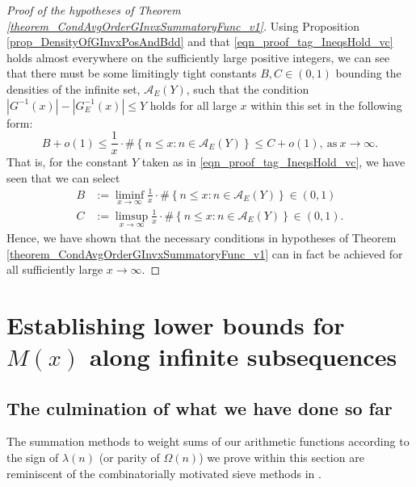 \documentclass[11pt,reqno,a4letter]{article}
\numberwithin{figure}{section}
\numberwithin{table}{section}
\theoremstyle{plain}
\numberwithin{theorem}{section}
\theoremstyle{definition}
\begin{document}
\begin{proof}[Proof of the hypotheses of Theorem \ref{theorem_CondAvgOrderGInvxSummatoryFunc_v1}]
Using Proposition \ref{prop_DensityOfGInvxPosAndBdd} and that 
\eqref{eqn_proof_tag_IneqsHold_vc} holds almost everywhere on the sufficiently large 
positive integers, 
we can see that there must be some limitingly tight constants 
$B, C \in (0, 1)$ bounding the densities of the infinite set, $\mathcal{A}_E(Y)$, such that the condition 
$|G^{-1}(x)| - |G_E^{-1}(x)| \leq Y$ holds for all large $x$ within this set in the following form: 
\[
B + o(1) \leq \frac{1}{x} \cdot \#\left\{n \leq x: n \in \mathcal{A}_E(Y)\right\} \leq C + o(1), 
     \mathrm{\ as\ } x \rightarrow \infty. 
\] 
That is, for the constant $Y$ taken as in \eqref{eqn_proof_tag_IneqsHold_vc}, 
we have seen that we can select 
\begin{align*} 
B & := \liminf_{x \rightarrow \infty} \frac{1}{x} \cdot \#\left\{n \leq x: n \in \mathcal{A}_E(Y)\right\} \in (0, 1) \\ 
C & := \limsup_{x \rightarrow \infty} \frac{1}{x} \cdot \#\left\{n \leq x: n \in \mathcal{A}_E(Y)\right\} \in (0, 1). 
\end{align*} 
Hence, we have shown that the necessary conditions in hypotheses of 
Theorem \ref{theorem_CondAvgOrderGInvxSummatoryFunc_v1} can in fact be achieved for all 
sufficiently large $x \rightarrow \infty$. 
\end{proof} 

\newpage
\section{Establishing lower bounds for $M(x)$ along infinite subsequences} 
\label{Section_KeyApplications} 

\subsection{The culmination of what we have done so far} 

The summation methods to weight sums of our arithmetic functions according to the sign of 
$\lambda(n)$ (or parity of $\Omega(n)$) we prove within this section are 
reminiscent of the combinatorially motivated sieve methods in 
\cite[\S 17]{OPERADECRIBERO}. 
\end{document}
